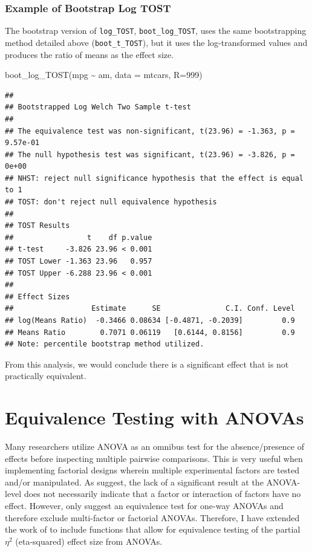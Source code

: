\documentclass[]{interact}
\theoremstyle{plain}%
\theoremstyle{definition}
\theoremstyle{remark}
\newenvironment{Shaded}{\begin{snugshade}}{\end{snugshade}}
\newcommand{\AttributeTok}[1]{\textcolor[rgb]{0.77,0.63,0.00}{#1}}
\newcommand{\DecValTok}[1]{\textcolor[rgb]{0.00,0.00,0.81}{#1}}
\newcommand{\FunctionTok}[1]{\textcolor[rgb]{0.00,0.00,0.00}{#1}}
\newcommand{\NormalTok}[1]{#1}
\newcommand{\SpecialCharTok}[1]{\textcolor[rgb]{0.00,0.00,0.00}{#1}}
\begin{document}
\newpage

\hypertarget{example-of-bootstrap-log-tost}{%
\subsubsection{Example of Bootstrap Log
TOST}\label{example-of-bootstrap-log-tost}}

The bootstrap version of \texttt{log\_TOST}, \texttt{boot\_log\_TOST},
uses the same bootstrapping method detailed above
(\texttt{boot\_t\_TOST}), but it uses the log-transformed values and
produces the ratio of means as the effect size.

\begin{Shaded}
\begin{Highlighting}[]
\FunctionTok{boot\_log\_TOST}\NormalTok{(mpg }\SpecialCharTok{\textasciitilde{}}\NormalTok{ am, }\AttributeTok{data =}\NormalTok{ mtcars, }\AttributeTok{R=}\DecValTok{999}\NormalTok{)}
\end{Highlighting}
\end{Shaded}

\begin{verbatim}
## 
## Bootstrapped Log Welch Two Sample t-test
## 
## The equivalence test was non-significant, t(23.96) = -1.363, p = 9.57e-01
## The null hypothesis test was significant, t(23.96) = -3.826, p = 0e+00
## NHST: reject null significance hypothesis that the effect is equal to 1 
## TOST: don't reject null equivalence hypothesis
## 
## TOST Results 
##                 t    df p.value
## t-test     -3.826 23.96 < 0.001
## TOST Lower -1.363 23.96   0.957
## TOST Upper -6.288 23.96 < 0.001
## 
## Effect Sizes 
##                  Estimate      SE               C.I. Conf. Level
## log(Means Ratio)  -0.3466 0.08634 [-0.4871, -0.2039]         0.9
## Means Ratio        0.7071 0.06119   [0.6144, 0.8156]         0.9
## Note: percentile bootstrap method utilized.
\end{verbatim}

From this analysis, we would conclude there is a significant effect that
is not practically equivalent.

\newpage

\hypertarget{equivalence-testing-with-anovas}{%
\section{Equivalence Testing with
ANOVAs}\label{equivalence-testing-with-anovas}}

Many researchers utilize ANOVA as an omnibus test for the
absence/presence of effects before inspecting multiple pairwise
comparisons. This is very useful when implementing factorial designs
wherein multiple experimental factors are tested and/or manipulated. As
\citet{Campbell_2021} suggest, the lack of a significant result at the
ANOVA-level does not necessarily indicate that a factor or interaction
of factors have no effect. However, \citet{Campbell_2021} only suggest
an equivalence test for one-way ANOVAs and therefore exclude
multi-factor or factorial ANOVAs. Therefore, I have extended the work of
\citet{Campbell_2021} to include functions that allow for equivalence
testing of the partial \(\eta^2\) (eta-squared) effect size from ANOVAs.
\end{document}

